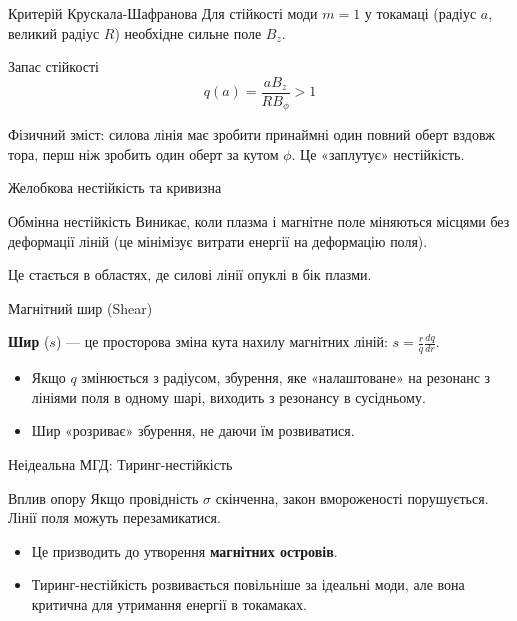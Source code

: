 \documentclass[]{beamer}
\begin{document}
\begin{frame}{Критерій Крускала-Шафранова}{}
	Для стійкості моди $m=1$ у токамаці (радіус $a$, великий радіус $R$) необхідне сильне поле $B_z$.
	\begin{exampleblock}{Запас стійкості}\justifying
		\begin{equation*}
			q(a) = \frac{a B_z}{R B_\phi} > 1
		\end{equation*}
	\end{exampleblock}
	Фізичний зміст: силова лінія має зробити принаймні один повний оберт вздовж тора, перш ніж зробить один оберт за кутом $\phi$. Це «заплутує» нестійкість.
\end{frame}

\begin{frame}{Желобкова нестійкість та кривизна}{}
	\begin{block}{Обмінна нестійкість}\justifying
		Виникає, коли плазма і магнітне поле міняються місцями без деформації ліній (це мінімізує витрати енергії на деформацію поля).
	\end{block}
	Це стається в областях, де силові лінії \alert{опуклі} в бік плазми.

\end{frame}

\begin{frame}{Магнітний шир (Shear)}{}
	\begin{definition}
		\textbf{Шир} ($s$) --- це просторова зміна кута нахилу магнітних ліній: $s = \frac{r}{q} \frac{dq}{dr}$.
	\end{definition}
	\begin{itemize}
		\item Якщо $q$ змінюється з радіусом, збурення, яке «налаштоване» на резонанс з лініями поля в одному шарі, виходить з резонансу в сусідньому.
		\item Шир «розриває» збурення, не даючи їм розвиватися.
	\end{itemize}
\end{frame}

\begin{frame}{Неідеальна МГД: Тиринг-нестійкість}{}
	\begin{alertblock}{Вплив опору}\justifying
		Якщо провідність $\sigma$ скінченна, закон вмороженості порушується. Лінії поля можуть перезамикатися.
	\end{alertblock}
	\begin{itemize}
		\item Це призводить до утворення \textbf{магнітних островів}.
		\item Тиринг-нестійкість розвивається повільніше за ідеальні моди, але вона критична для утримання енергії в токамаках.
	\end{itemize}

\end{frame}
\end{document}
